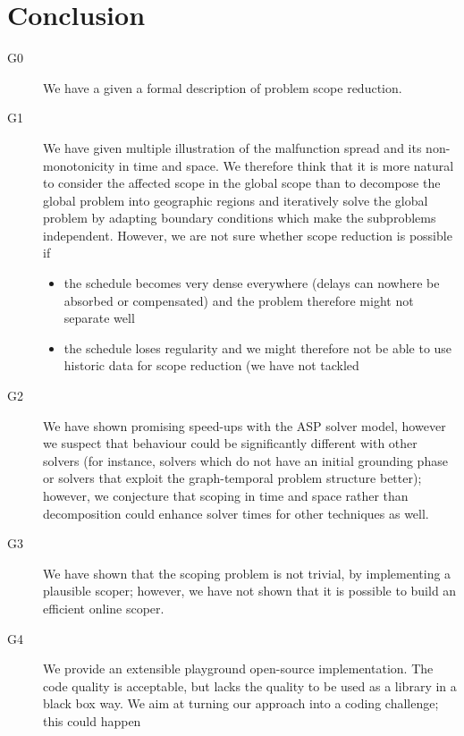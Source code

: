 \documentclass{article}
\begin{document}
\section{Conclusion}\label{sec:Conclusion}


\begin{description}
\item[G0] We have a given a formal description of problem scope reduction.
\item[G1] We have given multiple illustration of the malfunction spread and its non-monotonicity in time and space. We therefore think that it is more natural to consider the affected scope in the global scope than to decompose the global problem into geographic regions and iteratively solve the global problem by adapting boundary conditions which make the subproblems independent.
However, we are not sure whether scope reduction is possible if
    \begin{itemize}
        \item the schedule becomes very dense everywhere (delays can nowhere be absorbed or compensated) and the problem therefore might not separate well
        \item the schedule loses regularity and we might therefore not be able to use historic data for scope reduction (we have not tackled
    \end{itemize}
\item[G2] We have shown promising speed-ups with the ASP solver model, however we suspect that behaviour could be significantly different with other solvers (for instance, solvers which do not have an initial grounding phase or solvers that exploit the graph-temporal problem structure better); however, we conjecture that scoping in time and space rather than decomposition could enhance solver times for other techniques as well.
\item[G3] We have shown that the scoping problem is not trivial, by implementing a plausible scoper; however, we have not shown that it is possible to build an efficient online scoper.
\item[G4] We provide an extensible playground open-source implementation. The code quality is acceptable, but lacks the quality to be used as a library in a black box way. We aim at turning our approach into a coding challenge; this could happen

\end{description}
\end{document}
